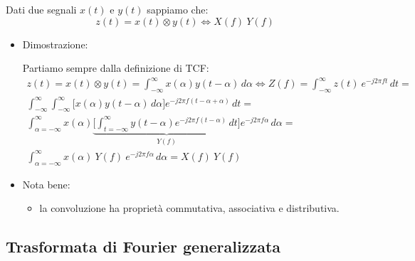 \documentclass[
  paper=a4,
  ,captions=tableheading
]{scrartcl}
\providecommand{\tightlist}{%
  \setlength{\itemsep}{0pt}\setlength{\parskip}{0pt}}
\begin{document}
\begin{enumerate}
  Dati due segnali \(x(t)\) e \(y(t)\) sappiamo che: \[
  z(t) = x(t) \otimes y(t) \Longleftrightarrow X(f) \ Y(f)
  \]

  \begin{itemize}
  \item
    Dimostrazione:

    Partiamo sempre dalla definizione di TCF: \begin{gather*}
    z(t) = x(t) \otimes y(t) = \int_{-\infty}^{\infty} x(\alpha) y(t-\alpha) \,d\alpha \Longleftrightarrow Z(f) = \int_{-\infty}^{\infty} z(t) \ e^{-j2\pi ft} \,dt = \\  \int_{-\infty}^{\infty} \int_{-\infty}^{\infty} \Big [ x(\alpha) y(t -\alpha) \,d\alpha  \Big] e^{-j2\pi f(t-\alpha+\alpha)} \,dt =\\
    \int_{\alpha=-\infty}^{\infty} x(\alpha) \underbrace{\Big [\int_{t=-\infty}^{\infty}y(t-\alpha)e^{-j2\pi f(t-\alpha)}\,dt \Big ]}_{Y(f)}  e^{-j2\pi f\alpha} \,d\alpha = \\ \int_{\alpha=-\infty}^{\infty} x(\alpha) \ Y(f) \ e^{-j2\pi f\alpha}\,d\alpha = X(f) \ Y(f)
    \end{gather*}
  \item
    Nota bene:

    \begin{itemize}
    \tightlist
    \item
      la convoluzione ha proprietà commutativa, associativa e
      distributiva.
    \end{itemize}
  \end{itemize}
\end{enumerate}

\subsection{Trasformata di Fourier
generalizzata}\label{trasformata-di-fourier-generalizzata}
\end{document}
